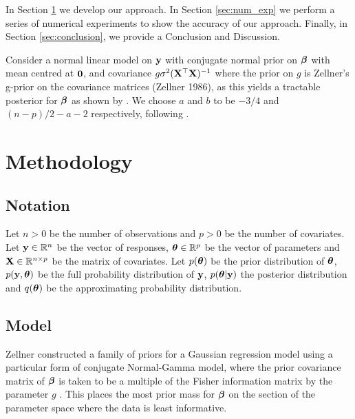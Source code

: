 \documentclass{amsart}[12pt]
\begin{document}

In Section \ref{sec:methodology} we develop our approach. In Section
\ref{sec:num_exp} we perform a series of numerical experiments to show the accuracy of our approach. Finally,
in Section \ref{sec:conclusion}, we provide a Conclusion and Discussion.

Consider a normal linear model on ${\bf y}$ with conjugate normal prior on ${\boldsymbol \beta}$ with mean centred at ${\bf 0}$,
and covariance $g \sigma^2 ({\bf X}^\top {\bf X})^{-1}$ where the prior on $g$ is Zellner's g-prior on the covariance
matrices (Zellner 1986), as this yields a tractable posterior for ${\boldsymbol \beta}$ as shown by \cite{Liang2008}. We
choose $a$  and $b$ to be $-3/4$ and $(n - p)/2 - a - 2$ respectively, following \cite{Maruyama2011}.

\section{Methodology}
\label{sec:methodology}

\subsection{Notation}


Let $n > 0$ be the number of observations and $p > 0$ be the number of covariates. Let ${\bf y} \in {\mathbb{R}}^n$ be the
vector of responses, ${\boldsymbol \theta} \in {\mathbb{R}}^p$ be the vector of parameters and ${\bf X} \in {\mathbb{R}}^{n \times p}$ be the
matrix of covariates. Let $p({\boldsymbol \theta})$ be the prior distribution of ${\boldsymbol \theta}$, $p({\bf y}, {\boldsymbol \theta})$ be the full
probability distribution of ${\bf y}$, $p({\boldsymbol \theta} | {\bf y})$ the posterior distribution and $q({\boldsymbol \theta})$ be the
approximating probability distribution. 

\subsection{Model}
\label{sec:model}

Zellner constructed a family of priors for a Gaussian regression model using a particular form of conjugate
Normal-Gamma model, where the prior covariance matrix of ${\boldsymbol \beta}$ is taken to be a multiple of the Fisher
information  matrix by the parameter $g$ \cite{Goel1986}. This places the most prior mass for ${\boldsymbol \beta}$ on the
section of the parameter space where the data is least informative.
\end{document}
